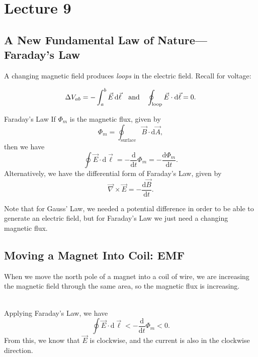\documentclass[class=article, crop=false]{standalone}
\begin{document}
  \section{Lecture 9}
  \subsection{A New Fundamental Law of Nature---Faraday's Law}
  A changing magnetic field produces \emph{loops} in the electric field. Recall for voltage:
  \begin{figure}[ht]
    \centering
  \end{figure}
  \[
    \Delta V_{ab} = - \int_{a}^{b}\vec{E} \,\mathrm{d}\vec{\ell}\quad \text{and}\quad \oint_\text{loop}\vec{E}\cdot \mathrm{d}\vec{\ell} = 0.
  \]
  \begin{theorem}{Faraday's Law}
    If $\Phi_m$ is the magnetic flux, given by
    \[
      \Phi_m = \oint_\text{surface} \vec{B}\cdot \mathrm{d}\vec{A},
    \]
    then we have
    \[
      \oint \vec{E}\cdot \mathrm{d}\vec{\ell} = - \frac{\mathrm{d}}{\mathrm{d}t}\Phi_m = - \frac{\mathrm{d}\Phi_m}{\mathrm{d}t}.
    \]
    Alternatively, we have the differential form of Faraday's Law, given by
    \[
      \vec{\nabla}\times \vec{E} = - \frac{\mathrm{d}\vec{B}}{\mathrm{d}t}.
    \]
  \end{theorem}
  \begin{figure}[ht]
      \centering
  \end{figure}
  \begin{note}{}
    Note that for Gauss' Law, we needed a potential difference in order to be able to generate an electric field, but for Faraday's Law we just need a changing magnetic flux.
  \end{note}
  \subsection{Moving a Magnet Into Coil: EMF}
  When we move the north pole of a magnet into a coil of wire, we are increasing the magnetic field through the same area, so the magnetic flux is increasing.
  \begin{figure}[ht]
    \centering
  \end{figure} \\
  Applying Faraday's Law, we have
  \[
    \oint \vec{E}\cdot \mathrm{d}\vec{\ell} < - \frac{\mathrm{d}}{\mathrm{d}t}\Phi_m < 0.
  \]
  From this, we know that $\vec{E}$ is clockwise, and the current is also in the clockwise direction.
\end{document}
